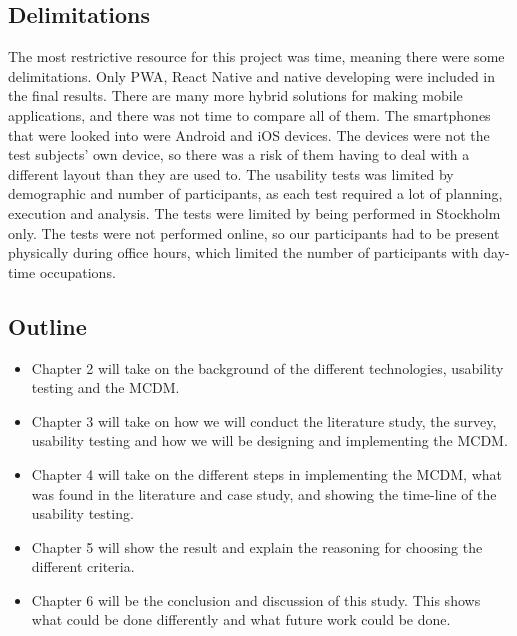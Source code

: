 \subsection{Delimitations}
The most restrictive resource for this project was time, meaning there were some delimitations. Only PWA, React Native and native developing were included in the final results. There are many more hybrid solutions for making mobile applications, and there was not time to compare all of them. 
The smartphones that were looked into were Android and iOS devices. The devices were not the test subjects’ own device, so there was a risk of them having to deal with a different layout than they are used to.
The usability tests was limited by demographic and number of participants, as each test required a lot of planning, execution and analysis. The tests were limited by being performed in Stockholm only. The tests were not performed online, so our participants had to be present physically during office hours, which limited the number of participants with day-time occupations. 


\subsection{Outline}

\begin{itemize}
    \item Chapter 2 will take on the background of the different technologies, usability testing and the MCDM.
    \item Chapter 3 will take on how we will conduct the literature study, the survey, usability testing and how we will be designing and implementing the MCDM.
    \item Chapter 4 will take on the different steps in implementing the MCDM, what was found in the literature and case study, and showing the time-line of the usability testing.
    \item Chapter 5 will show the result and explain the reasoning for choosing the different criteria.
    \item Chapter 6 will be the conclusion and discussion of this study. This shows what could be done differently and what future work could be done.
\end{itemize}